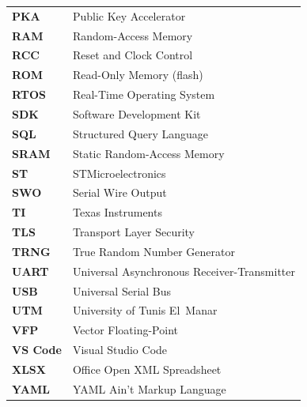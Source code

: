 \begin{longtable}{@{}p{}p{}@{}}
\textbf{PKA} & Public Key Accelerator \\
\textbf{RAM} & Random-Access Memory \\
\textbf{RCC} & Reset and Clock Control \\
\textbf{ROM} & Read-Only Memory (flash) \\
\textbf{RTOS} & Real-Time Operating System \\
\textbf{SDK} & Software Development Kit \\
\textbf{SQL} & Structured Query Language \\
\textbf{SRAM} & Static Random-Access Memory \\
\textbf{ST} & STMicroelectronics \\
\textbf{SWO} & Serial Wire Output \\
\textbf{TI} & Texas Instruments \\
\textbf{TLS} & Transport Layer Security \\
\textbf{TRNG} & True Random Number Generator \\
\textbf{UART} & Universal Asynchronous Receiver-Transmitter \\
\textbf{USB} & Universal Serial Bus \\
\textbf{UTM} & University of Tunis El~Manar \\
\textbf{VFP} & Vector Floating-Point \\
\textbf{VS Code} & Visual Studio Code \\
\textbf{XLSX} & Office Open XML Spreadsheet \\
\textbf{YAML} & YAML Ain't Markup Language \\

\end{longtable}